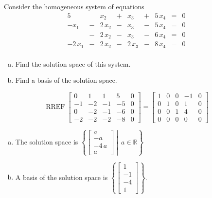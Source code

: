 
\begin{exerciseStatement}


Consider the homogeneous system of equations 
\begin{alignat*}{5}  & & x_{2} &+& x_{3} &+& 5 \, x_{4} &=& 0 \\-x_{1} &-& 2 \, x_{2} &-& x_{3} &-& 5 \, x_{4} &=& 0 \\ &-& 2 \, x_{2} &-& x_{3} &-& 6 \, x_{4} &=& 0 \\-2 \, x_{1} &-& 2 \, x_{2} &-& 2 \, x_{3} &-& 8 \, x_{4} &=& 0 \\ \end{alignat*}
            


\begin{enumerate}[(a)]
\item  Find the solution space of this system.
\item  Find a basis of the solution space.
\end{enumerate}
    
\end{exerciseStatement}
    
\begin{exerciseAnswer} 


\[\operatorname{RREF} \left[\begin{array}{cccc|c}
0 & 1 & 1 & 5 & 0 \\
-1 & -2 & -1 & -5 & 0 \\
0 & -2 & -1 & -6 & 0 \\
-2 & -2 & -2 & -8 & 0
\end{array}\right] = \left[\begin{array}{cccc|c}
1 & 0 & 0 & -1 & 0 \\
0 & 1 & 0 & 1 & 0 \\
0 & 0 & 1 & 4 & 0 \\
0 & 0 & 0 & 0 & 0
\end{array}\right] \]


\begin{enumerate}[(a)]
\item The solution space is \( \left\{ \left[\begin{array}{c}
a \\
-a \\
-4 \, a \\
a
\end{array}\right] \middle|\,a\in\mathbb{R}\right\} \)
\item A basis of the solution space is \( \left\{ \left[\begin{array}{c}
1 \\
-1 \\
-4 \\
1
\end{array}\right] \right\} \).
\end{enumerate}
    
\end{exerciseAnswer}
    

